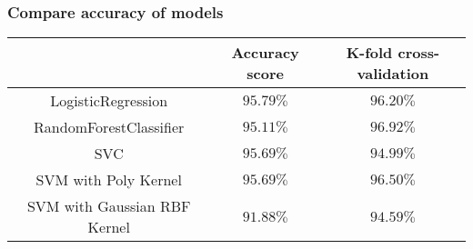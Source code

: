 \documentclass[10pt]{beamer}
\theoremstyle{definition}
\theoremstyle{remark}
\numberwithin{equation}{section}
\begin{document}
\begin{frame}
	\frametitle{Compare accuracy of models}
	
	\begin{center}
		\begin{tabular}{ | c | c| c | } 
				\hline
			& Accuracy score & K-fold cross-validation \\ 
			\hline
		LogisticRegression & $95.79 \%$ & $96.20 \%$ \\ 
			\hline
			RandomForestClassifier & $95.11 \%$ & $96.92 \%$ \\ 
			\hline
			SVC & $95.69 \%$ & $94.99 \%$ \\ 
		\hline
			SVM with Poly Kernel & $95.69 \%$ & $96.50 \%$  \\ 
		\hline
			SVM with Gaussian RBF Kernel & $91.88 \%$ & $94.59 \%$  \\ 
		\hline
		\end{tabular}
	\end{center}
	
\end{frame}
\end{document}

